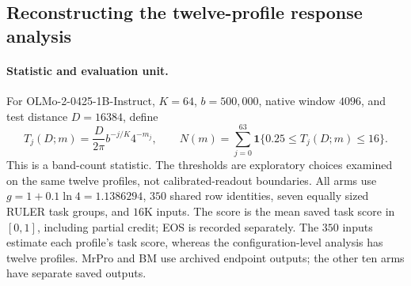 \subsection{Reconstructing the twelve-profile response analysis}
\label{sec:profile-diagnostic-audit}

\paragraph{Statistic and evaluation unit.}
For OLMo-2-0425-1B-Instruct, $K=64$, $b=500{,}000$, native window $4096$, and test distance $D=16384$, define
\begin{equation}
T_j(D;m)=\frac{D}{2\pi}b^{-j/K}4^{-m_j},\qquad
N(m)=\sum_{j=0}^{63}\mathbf1\{0.25\le T_j(D;m)\le16\}.
\label{eq:profile-count}
\end{equation}
This is a band-count statistic. The thresholds are exploratory choices examined on the same twelve profiles, not calibrated-readout boundaries. All arms use $g=1+0.1\ln4=1.1386294$, $350$ shared row identities, seven equally sized RULER task groups, and $16$K inputs. The score is the mean saved task score in $[0,1]$, including partial credit; EOS is recorded separately. The $350$ inputs estimate each profile's task score, whereas the configuration-level analysis has twelve profiles. MrPro and BM use archived endpoint outputs; the other ten arms have separate saved outputs.

